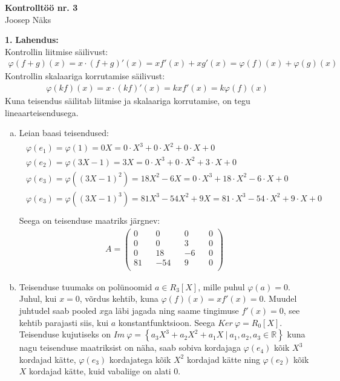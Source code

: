 \documentclass{article}
\begin{document}
\begin{center}
\Large\textbf{Kontrolltöö nr. 3}\\
\small{Joosep Näks}
\end{center}
\textbf{1.}
\textbf{Lahendus:}\\
Kontrollin liitmise säilivust:
\begin{gather*}
\varphi(f+g)(x)=x\cdot(f+g)'(x)=x f'(x)+xg'(x) = \varphi(f)(x)+\varphi(g)(x)
\end{gather*}
Kontrollin skalaariga korrutamise säilivust:
\begin{gather*}
\varphi(kf)(x)=x\cdot(kf)'(x)=kx f'(x) = k\varphi(f)(x)
\end{gather*}
Kuna teisendus säilitab liitmise ja skalaariga korrutamise, on tegu lineaarteisendusega.
\begin{enumerate}[(a)]
\item Leian baasi teisendused:
\begin{gather*}
\begin{aligned}
\varphi(e_1)=\varphi(1)=0X=0\cdot X^3+0\cdot X^2+0\cdot X+0\\
\varphi(e_2)=\varphi(3X-1)=3X=0\cdot X^3+0\cdot X^2+3\cdot X+0\\
\varphi(e_3)=\varphi((3X-1)^2)=18X^2-6X=0\cdot X^3+18\cdot X^2-6\cdot X+0\\
\varphi(e_3)=\varphi((3X-1)^3)=81X^3-54X^2+9X=81\cdot X^3-54\cdot X^2+9\cdot X+0\\
\end{aligned}
\end{gather*}
Seega on teisenduse maatriks järgnev:
\begin{gather*}
A=
\begin{pmatrix}
0 && 0 && 0 && 0\\
0 && 0 && 3 && 0\\
0 && 18 && -6 && 0\\
81 && -54 && 9 && 0\\
\end{pmatrix}
\end{gather*}
\item Teisenduse tuumaks on polünoomid $a\in R_3[X]$, mille puhul $\varphi(a)=0$. Juhul, kui $x=0$, võrdus kehtib, kuna $\varphi(f)(x)=xf'(x)=0$. Muudel juhtudel saab pooled $x$ga läbi jagada ning saame tingimuse $f'(x)=0$, see kehtib parajasti siis, kui $a$ konstantfunktsioon. Seega $Ker\  \varphi = R_0[X]$.\\
Teisenduse kujutiseks on $Im\ \varphi=\left\{a_3X^3+a_2X^2+a_1X\ |\ a_1,a_2,a_3\in\mathbb{R}\right\}$ kuna nagu teisenduse maatriksist on näha, saab sobiva kordajaga $\varphi(e_4)$ kõik $X^3$ kordajad kätte, $\varphi(e_3)$ kordajatega kõik $X^2$ kordajad kätte ning $\varphi(e_2)$ kõik $X$ kordajad kätte, kuid vabaliige on alati 0.
\end{enumerate}
\end{document}
